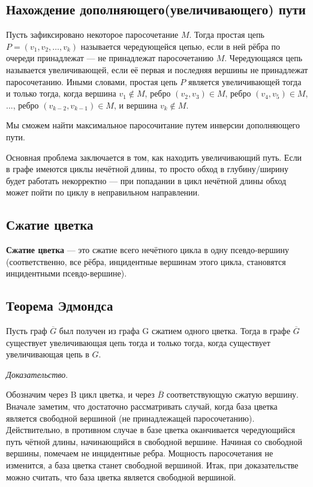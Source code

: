 \documentclass[14pt, a4paper]{extarticle}
\begin{document}
    \subsection*{Нахождение дополняющего(увеличивающего) пути}

    Пусть зафиксировано некоторое паросочетание $M$. Тогда простая цепь $P = (v_1, v_2, \ldots, v_k)$ называется чередующейся цепью, если в ней рёбра по очереди принадлежат --- не принадлежат паросочетанию $M$. Чередующаяся цепь называется увеличивающей, если её первая и последняя вершины не принадлежат паросочетанию. Иными словами, простая цепь $P$ является увеличивающей тогда и только тогда, когда вершина $v_1 \not\in M$, ребро $(v_2,v_3) \in M$, ребро $(v_4,v_5) \in M$, ..., ребро $(v_{k-2},v_{k-1}) \in M$, и вершина $v_k \not\in M$.

    Мы сможем найти максимальное паросочитание путем инверсии дополняющего пути.

    Основная проблема заключается в том, как находить увеличивающий путь. Если в графе имеются циклы нечётной длины, то просто обход в глубину/ширину будет работать некорректно --- при попадании в цикл нечётной длины обход может пойти по циклу в неправильном направлении.

    \pagebreak

    \subsection*{Сжатие цветка}

    \textbf{Сжатие цветка} — это сжатие всего нечётного цикла в одну псевдо-вершину (соответственно, все рёбра, инцидентные вершинам этого цикла, становятся инцидентными псевдо-вершине).
    
    \subsection*{Теорема Эдмондса}

    Пусть граф $\overline G$ был получен из графа G сжатием одного цветка.
    Тогда в графе $\overline G$ существует увеличивающая цепь тогда и только тогда, когда существует увеличивающая цепь в $G$.

    \textit{Доказательство}. 
    
    Обозначим через B цикл цветка, и через $\overline B$ соответствующую сжатую вершину.
    Вначале заметим, что достаточно рассматривать случай, когда база цветка является свободной вершиной (не принадлежащей паросочетанию). Действительно, в противном случае в базе цветка оканчивается чередующийся путь чётной длины, начинающийся в свободной вершине. Начиная со свободной вершины, помечаем не инцидентные ребра. Мощность паросочетания не изменится, а база цветка станет свободной вершиной. Итак, при доказательстве можно считать, что база цветка является свободной вершиной.
\end{document}
